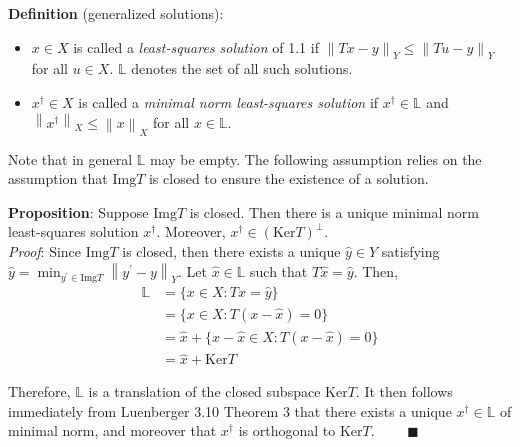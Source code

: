 \documentclass[12pt]{amsart}
\newcommand*{\norm}[1]{\left\lVert#1\right\rVert}
\newcommand{\Img}{\mathrm{Img}}
\newcommand{\Ker}{\mathrm{Ker}}
\begin{document}
 \textbf{Definition} (generalized solutions): 
 \begin{itemize}
 \item $x \in X$ is called a \textit{least-squares solution} of 1.1 if $\norm{Tx - y}_Y \leq \norm{Tu - y}_Y$ for all $u \in X$. $\mathbb{L}$ denotes the set of all such solutions. 
 \item $x^\dagger \in X$ is called a \textit{minimal norm least-squares solution} if $x^\dagger \in \mathbb{L}$ and $\norm{x^\dagger}_X \leq \norm{x}_X$ for all $x \in \mathbb{L}$. 
 \end{itemize} 
 
 Note that in general $\mathbb{L}$ may be empty. The following assumption relies on the assumption that $\Img T$ is closed to ensure the existence of a solution. 
 
 \textbf{Proposition}: Suppose $\Img T$ is closed. Then there is a unique minimal norm least-squares solution $x^\dagger$. Moreover, $x^\dagger \in (\Ker T)^\perp$. \\[.1cm]
 
 \textit{Proof}: Since $\Img T$ is closed, then there exists a unique $\hat{y} \in Y$ satisfying $\hat{y} = \min_{y^\prime \in \Img T} \norm{y^\prime - y}_{Y}$. Let $\hat{x} \in \mathbb{L}$ such that $T\hat{x} = \hat{y}$. Then, 
 \begin{align*} 
 \mathbb{L} &= \{x \in X: Tx = \hat{y}\} \\
                   &= \{x \in X: T(x - \hat{x}) = 0\} \\
                   &= \hat{x} + \{x - \hat{x} \in X: T(x - \hat{x}) = 0\} \\
                   &= \hat{x} + \Ker T
 \end{align*}  
 
 Therefore, $ \mathbb{L}$ is a translation of the closed subspace $\Ker T$. It then follows immediately from Luenberger 3.10 Theorem 3 that there exists a unique $x^\dagger \in \mathbb{L}$ of minimal norm, and moreover that $x^\dagger$ is orthogonal to $\Ker T$. $\qquad \blacksquare$
\end{document}
